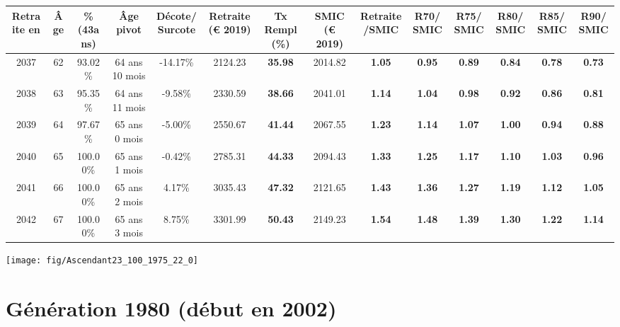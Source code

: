 \begin{adjustbox}{max width=\textwidth} 
\begin{tabular}[htb]{|c|c||c|c|c||c|c||c|c||c|c|c|c|c|} 
\hline 
 Retraite en &  Âge &  \%(43ans) &  Âge pivot &  Décote/Surcote &  Retraite (\euro{} 2019) &  Tx Rempl(\%) &  SMIC (\euro{} 2019) &  Retraite/SMIC &  R70/SMIC &  R75/SMIC &  R80/SMIC &  R85/SMIC &  R90/SMIC \\ 
\hline \hline 
 2037 &  62 &  93.02\% &  64 ans 10 mois &  -14.17\% &  2124.23 &  {\bf 35.98} &  2014.82 &  {\bf 1.05} &  {\bf {\color{red} 0.95}} &  {\bf {\color{red} 0.89}} &  {\bf {\color{red} 0.84}} &  {\bf {\color{red} 0.78}} &  {\bf {\color{red} 0.73}} \\ 
\hline 
 2038 &  63 &  95.35\% &  64 ans 11 mois &  -9.58\% &  2330.59 &  {\bf 38.66} &  2041.01 &  {\bf 1.14} &  {\bf 1.04} &  {\bf {\color{red} 0.98}} &  {\bf {\color{red} 0.92}} &  {\bf {\color{red} 0.86}} &  {\bf {\color{red} 0.81}} \\ 
\hline 
 2039 &  64 &  97.67\% &  65 ans 0 mois &  -5.00\% &  2550.67 &  {\bf 41.44} &  2067.55 &  {\bf 1.23} &  {\bf 1.14} &  {\bf 1.07} &  {\bf 1.00} &  {\bf {\color{red} 0.94}} &  {\bf {\color{red} 0.88}} \\ 
\hline 
 2040 &  65 &  100.00\% &  65 ans 1 mois &  -0.42\% &  2785.31 &  {\bf 44.33} &  2094.43 &  {\bf 1.33} &  {\bf 1.25} &  {\bf 1.17} &  {\bf 1.10} &  {\bf 1.03} &  {\bf {\color{red} 0.96}} \\ 
\hline 
 2041 &  66 &  100.00\% &  65 ans 2 mois &  4.17\% &  3035.43 &  {\bf 47.32} &  2121.65 &  {\bf 1.43} &  {\bf 1.36} &  {\bf 1.27} &  {\bf 1.19} &  {\bf 1.12} &  {\bf 1.05} \\ 
\hline 
 2042 &  67 &  100.00\% &  65 ans 3 mois &  8.75\% &  3301.99 &  {\bf 50.43} &  2149.23 &  {\bf 1.54} &  {\bf 1.48} &  {\bf 1.39} &  {\bf 1.30} &  {\bf 1.22} &  {\bf 1.14} \\ 
\hline 
\hline 
\end{tabular} 
\end{adjustbox} 
 
 \vspace{0.1cm} 

 {\hspace{-2.2cm}\texttt{[image: fig/Ascendant23\_100\_1975\_22\_0]}} 

\newpage 
 
\section{Génération 1980 (début en 2002)\label{Ascendant23_100_1980_22_0}} 
 
